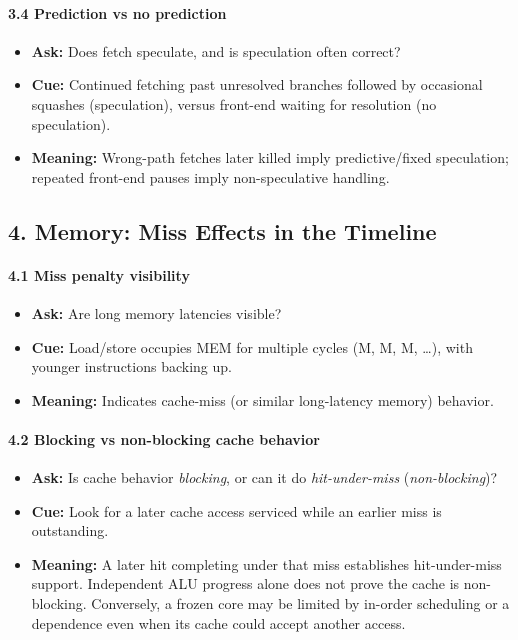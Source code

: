 \paragraph{3.4 Prediction vs no prediction}\label{par:auto-038}
\begin{itemize}
    \item \textbf{Ask:} Does fetch speculate, and is speculation often correct?
    \item \textbf{Cue:} Continued fetching past unresolved branches followed by occasional squashes (speculation), versus front-end waiting for resolution (no speculation).
    \item \textbf{Meaning:} Wrong-path fetches later killed imply predictive/fixed speculation; repeated front-end pauses imply non-speculative handling.
\end{itemize}

\subsection*{4. Memory: Miss Effects in the Timeline}\label{subsec:auto-018}

\paragraph{4.1 Miss penalty visibility}\label{par:auto-039}
\begin{itemize}
    \item \textbf{Ask:} Are long memory latencies visible?
    \item \textbf{Cue:} Load/store occupies MEM for multiple cycles (M, M, M, \ldots), with younger instructions backing up.
    \item \textbf{Meaning:} Indicates cache-miss (or similar long-latency memory) behavior.
\end{itemize}

\paragraph{4.2 Blocking vs non-blocking cache behavior}\label{par:auto-040}
\begin{itemize}
    \item \textbf{Ask:} Is cache behavior \textit{blocking}, or can it do \textit{hit-under-miss} (\textit{non-blocking})?
    \item \textbf{Cue:} Look for a later cache access serviced while an earlier miss is outstanding.
    \item \textbf{Meaning:} A later hit completing under that miss establishes hit-under-miss support.
    Independent ALU progress alone does not prove the cache is non-blocking.
    Conversely, a frozen core may be limited by in-order scheduling or a dependence even when its cache could accept another access.
\end{itemize}

